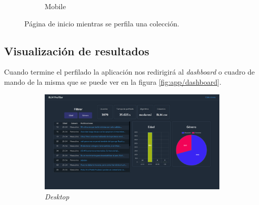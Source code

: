 \begin{figure}[H]
\begin{subfigure}{0.2215\textwidth}
      \caption{Mobile} 
  \end{subfigure}
  \caption{Página de inicio mientras se perfila una colección.}
  \label{fig:app/home-perfilando}
\end{figure}
\subsection{Visualización de resultados}

Cuando termine el perfilado la aplicación nos redirigirá al \textit{dashboard} o cuadro de mando de la misma que se puede ver en la figura \ref{fig:app/dashboard}.

\begin{figure}[H]
  \centering
  \begin{subfigure}{0.7\textwidth}
   \includegraphics[width=\textwidth]{imaxes/capturas-app/desktop/dashboard.png}
  \caption{\textit{Desktop}} 
  \end{subfigure}
  \begin{subfigure}{0.2215\textwidth}

\end{subfigure}
\end{figure}
